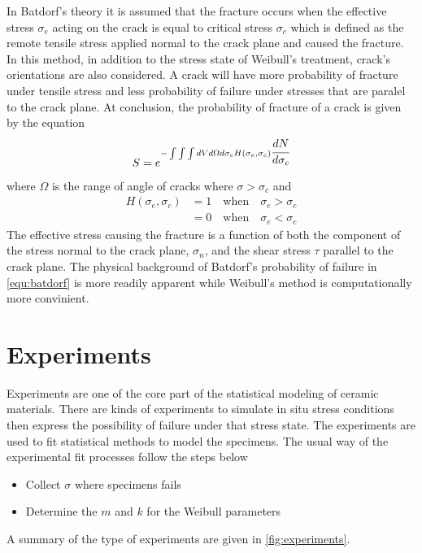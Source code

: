 \documentclass[]{article}
\begin{document}
In Batdorf's theory it is assumed that the fracture occurs when the effective stress $\sigma_e$ acting on the crack is equal to critical stress $\sigma_c$ which is defined as the remote tensile stress applied normal to the crack plane and caused the fracture. In this method, in addition to the stress state of Weibull's treatment, crack's orientations are also considered. A crack will have more probability of fracture under tensile stress and less probability of failure under stresses that are paralel to the crack plane. At conclusion, the probability of fracture of a crack is given by the equation
\begin{align}
S=e^{-\int\int\int dV d \Omega d\sigma_c H\left(\sigma_e, \sigma_c\right)\cfrac{d N}{d \sigma_c}}
\label{equ:batdorf}
\end{align}
where $\Omega$ is the range of angle of cracks where $\sigma>\sigma_c$ and
\begin{align}
H\left(\sigma_e,\sigma_c\right)&=1\quad \text{when}\quad \sigma_e>\sigma_c\\
&=0\quad \text{when}\quad \sigma_e<\sigma_c
\end{align}
The effective stress causing the fracture is a function of both the component of the stress normal to the crack plane, $\sigma_n$, and the shear stress $\tau$ parallel to the crack plane. The physical background of Batdorf's probability of failure in \cref{equ:batdorf} is more readily apparent while Weibull's method is computationally more convinient.

\section{Experiments}
Experiments are one of the core part of the statistical modeling of ceramic materials. There are kinds of experiments to simulate in situ stress conditions then express the possibility of failure under that stress state. The experiments are used to fit statistical methods to model the specimens. The usual way of the experimental fit processes follow the steps below
\begin{itemize}
\item{ Collect $\sigma$ where specimens fails}
\item{ Determine the $m$ and $k$ for the Weibull parameters}
\end{itemize}
A summary of the type of experiments are given in \cref{fig:experiments}.\newline 
\end{document}
